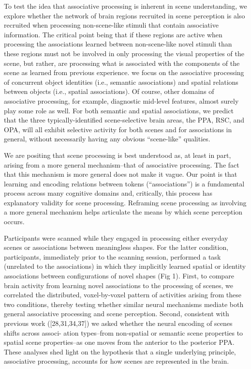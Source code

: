 \documentclass[english]{article}
\begin{document}
%
To test the idea that associative processing is inherent in scene understanding,
we explore whether the network of brain regions recruited in scene perception is
also recruited when processing non-scene-like stimuli that contain associative
information\citep{aminoff2015associative}.
%
The critical point being that if these regions are active when processing the
associations learned between non-scene-like novel stimuli than these regions
must not be involved in only processing the visual properties of the scene, but
rather, are processing what is associated with the components of the scene as
learned from previous experience\citep{aminoff2015associative}.
%
we focus on the associative processing of concurrent object identities (i.e.,
semantic associations) and spatial relations between objects (i.e., spatial
associations)\citep{aminoff2015associative}.
%
Of course, other domains of associative processing, for example, diagnostic
mid-level features, almost surely play some role as
well\citep{aminoff2015associative}.
%
For both semantic and spatial associations, we predict that the three
typically-identified scene-selective brain areas, the PPA, RSC, and OPA, will
all exhibit selective activity for both scenes and for associations in general,
without necessarily having any obvious “scene-like”
qualities\citep{aminoff2015associative}.

%
We are positing that scene processing is best understood as, at least in part,
arising from a more general mechanism–that of associative
processing\citep{aminoff2015associative}.
%
The fact that this mechanism is more general does not make it vague. Our point
is that learning and encoding relations between tokens (“associations”) is a
fundamental process across many cognitive domains and, critically, this process
has explanatory validity for scene processing\citep{aminoff2015associative}.
%
Reframing scene processing as involving a more general mechanism helps
articulate the means by which scene perception
occurs\citep{aminoff2015associative}.

%
Participants were scanned while they engaged in processing either everyday
scenes or associations between meaningless shapes\citep{aminoff2015associative}.
%
For the latter condition, participants, immediately prior to the scanning
session, performed a task (unrelated to the associations) in which they
implicitly learned spatial or identity associations between configurations of
novel shapes (Fig 1)\citep{aminoff2015associative}.
%
First, to compare brain activity from learning novel associations to the
processing of scenes, we correlated the distributed, voxel-by-voxel pattern of
activities arising from these two conditions, thereby testing whether similar
neural mechanisms mediate both general associative processing and scene
perception\citep{aminoff2015associative}.
%
Second, consistent with previous work ([28,31,34,37]) we asked whether the
neural encoding of scenes shifts across associ- ation types–from non-spatial or
semantic scene properties to spatial scene properties–as one moves from the
anterior to the posterior PPA\citep{aminoff2015associative}.
%
These analyses shed light on the hypothesis that a single underlying
principle, associative processing, accounts for how scenes are represented in
the brain\citep{aminoff2015associative}.
\end{document}

